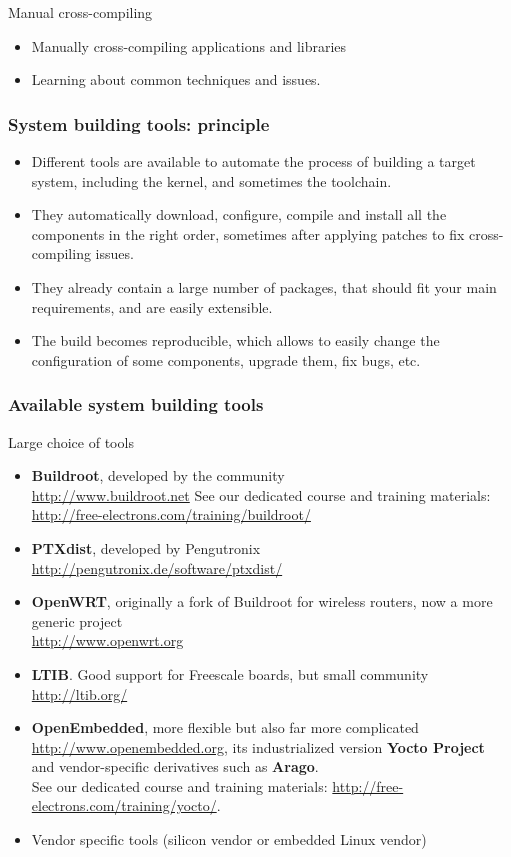 \setuplabframe
{Manual cross-compiling}
{
  \begin{itemize}
  \item Manually cross-compiling applications and libraries
  \item Learning about common techniques and issues.
  \end{itemize}
}

\begin{frame}
  \frametitle{System building tools: principle}
  \begin{itemize}
  \item Different tools are available to automate the process of
    building a target system, including the kernel, and sometimes the
    toolchain.
  \item They automatically download, configure, compile and install
    all the components in the right order, sometimes after applying
    patches to fix cross-compiling issues.
  \item They already contain a large number of packages, that should
    fit your main requirements, and are easily extensible.
  \item The build becomes reproducible, which allows to easily change
    the configuration of some components, upgrade them, fix bugs, etc.
  \end{itemize}
\end{frame}

\begin{frame}
  \frametitle{Available system building tools} Large choice of tools
  \small
  \begin{itemize}
  \item {\bf Buildroot}, developed by the community\\
    \url{http://www.buildroot.net}
    See our dedicated course and training materials:
    \url{http://free-electrons.com/training/buildroot/}
  \item {\bf PTXdist}, developed by Pengutronix\\
    \url{http://pengutronix.de/software/ptxdist/}
  \item {\bf OpenWRT}, originally a fork of Buildroot for wireless routers,
    now a more generic project\\
    \url{http://www.openwrt.org}
  \item {\bf LTIB}. Good support for Freescale boards, but small community\\
    \url{http://ltib.org/}
  \item {\bf OpenEmbedded}, more flexible but also far more complicated\\
    \url{http://www.openembedded.org}, its industrialized version {\bf
      Yocto Project} and vendor-specific derivatives such as {\bf Arago}.\\
      See our dedicated course and training materials: 
      \url{http://free-electrons.com/training/yocto/}.
  \item Vendor specific tools (silicon vendor or embedded Linux
    vendor)
  \end{itemize}
\end{frame}

